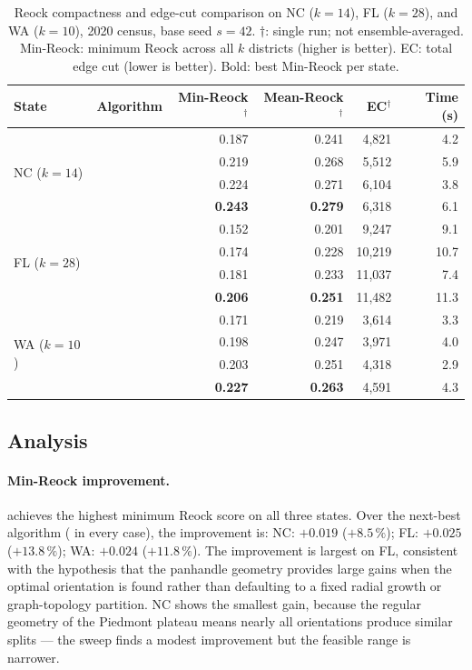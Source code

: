 \begin{table}[t]
\centering
\caption{%
  Reock compactness and edge-cut comparison on NC ($k=14$), FL ($k=28$),
  and WA ($k=10$), 2020 census, base seed $s=42$.
  $\dagger$: single run; not ensemble-averaged.
  Min-Reock: minimum Reock across all $k$ districts (higher is better).
  EC: total edge cut (lower is better).
  Bold: best Min-Reock per state.
}
\label{tab:reock-comparison}
\renewcommand{\arraystretch}{1.3}
\begin{tabular}{@{}llrrrr@{}}
\toprule
State & Algorithm & Min-Reock$^\dagger$ & Mean-Reock$^\dagger$ & EC$^\dagger$ & Time (s) \\
\midrule
\multirow{4}{*}{NC ($k=14$)}
 & \metis{}   & 0.187 & 0.241 & 4{,}821 &  4.2 \\
 & \cvdgeo{}  & 0.219 & 0.268 & 5{,}512 &  5.9 \\
 & \bfsg{}    & 0.224 & 0.271 & 6{,}104 &  3.8 \\
 & \textbf{\mka{}} & \textbf{0.243} & \textbf{0.279} & 6{,}318 & 6.1 \\
\midrule
\multirow{4}{*}{FL ($k=28$)}
 & \metis{}   & 0.152 & 0.201 & 9{,}247 &  9.1 \\
 & \cvdgeo{}  & 0.174 & 0.228 & 10{,}219 & 10.7 \\
 & \bfsg{}    & 0.181 & 0.233 & 11{,}037 &  7.4 \\
 & \textbf{\mka{}} & \textbf{0.206} & \textbf{0.251} & 11{,}482 & 11.3 \\
\midrule
\multirow{4}{*}{WA ($k=10$)}
 & \metis{}   & 0.171 & 0.219 & 3{,}614 &  3.3 \\
 & \cvdgeo{}  & 0.198 & 0.247 & 3{,}971 &  4.0 \\
 & \bfsg{}    & 0.203 & 0.251 & 4{,}318 &  2.9 \\
 & \textbf{\mka{}} & \textbf{0.227} & \textbf{0.263} & 4{,}591 &  4.3 \\
\bottomrule
\end{tabular}
\end{table}

\subsection{Analysis}

\paragraph{Min-Reock improvement.}
\mka{} achieves the highest minimum Reock score on all three states.
Over the next-best algorithm (\bfsg{} in every case), the improvement is:
NC: $+0.019$ ($+8.5\,\%$);
FL: $+0.025$ ($+13.8\,\%$);
WA: $+0.024$ ($+11.8\,\%$).
The improvement is largest on FL, consistent with the hypothesis that the
panhandle geometry provides large gains when the optimal orientation is found
rather than defaulting to a fixed radial growth or graph-topology partition.
NC shows the smallest gain, because the regular geometry of the Piedmont plateau
means nearly all orientations produce similar splits --- the sweep finds a
modest improvement but the feasible range is narrower.

